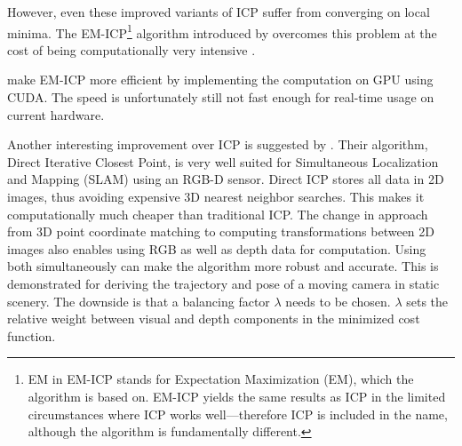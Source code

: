 However, even these improved variants of ICP suffer from converging on local minima. The EM-ICP\footnote{EM in EM-ICP stands for Expectation Maximization (EM), which the algorithm is based on. EM-ICP yields the same results as ICP in the limited circumstances where ICP works well---therefore ICP is included in the name, although the algorithm is fundamentally different.} algorithm introduced by \citet{granger2006multi} overcomes this problem at the cost of being computationally very intensive \citep{tamaki2010softassign}.

\citet{tamaki2010softassign} make EM-ICP more efficient by implementing the computation on GPU using CUDA. The speed is unfortunately still not fast enough for real-time usage on current hardware.

Another interesting improvement over ICP is suggested by \citet{tykkala2011direct}. Their algorithm, Direct Iterative Closest Point, is very well suited for Simultaneous Localization and Mapping (SLAM) using an RGB-D sensor. Direct ICP stores all data in 2D images, thus avoiding expensive 3D nearest neighbor searches. This makes it computationally much cheaper than traditional ICP. The change in approach from 3D point coordinate matching to computing transformations between 2D images also enables using RGB as well as depth data for computation. Using both simultaneously can make the algorithm more robust and accurate. This is demonstrated for deriving the trajectory and pose of a moving camera in static scenery. The downside is that a balancing factor $\lambda$ needs to be chosen. $\lambda$ sets the relative weight between visual and depth components in the minimized cost function.


\newtopic

